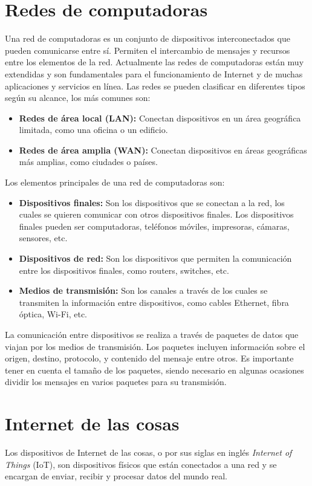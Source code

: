 \section{Redes de computadoras}
Una red de computadoras es un conjunto de dispositivos interconectados que pueden comunicarse entre sí. Permiten el intercambio de mensajes y recursos entre los elementos de la red. Actualmente las redes de computadoras están muy extendidas y son fundamentales para el funcionamiento de Internet y de muchas aplicaciones y servicios en línea.
Las redes se pueden clasificar en diferentes tipos según su alcance, los más comunes son:
\begin{itemize}
	\item \textbf{Redes de área local (LAN):} Conectan dispositivos en un área geográfica limitada, como una oficina o un edificio.
	\item \textbf{Redes de área amplia (WAN):} Conectan dispositivos en áreas geográficas más amplias, como ciudades o países.
\end{itemize}

Los elementos principales de una red de computadoras son:
\begin{itemize}
	\item \textbf{Dispositivos finales:} Son los dispositivos que se conectan a la red, los cuales se quieren comunicar con otros dispositivos finales. Los dispositivos finales pueden ser computadoras, teléfonos móviles, impresoras, cámaras, sensores, etc.
	\item \textbf{Dispositivos de red:} Son los dispositivos que permiten la comunicación entre los dispositivos finales, como routers, switches, etc.
	\item \textbf{Medios de transmisión:} Son los canales a través de los cuales se transmiten la información entre dispositivos, como cables Ethernet, fibra óptica, Wi-Fi, etc.
\end{itemize}

La comunicación entre dispositivos se realiza a través de paquetes de datos que viajan por los medios de transmisión. Los paquetes incluyen información sobre el origen, destino, protocolo, y contenido del mensaje entre otros. Es importante tener en cuenta el tamaño de los paquetes, siendo necesario en algunas ocasiones dividir los mensajes en varios paquetes para su transmisión.


\section{Internet de las cosas}
Los dispositivos de Internet de las cosas, o por sus siglas en inglés \textit{Internet of Things} (IoT), son dispositivos físicos que están conectados a una red y se encargan de enviar, recibir y procesar datos del mundo real. ~\cite{AzizAlKabir2023} 

